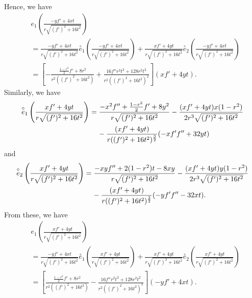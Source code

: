 \documentclass{amsart}
\theoremstyle{Corollary}
\numberwithin{equation}{section}
\begin{document}
Hence, we have 
\begin{equation}\label{3.12}
\begin{split}
&e_1\left(\frac{-yf'+4xt}{r\sqrt{(f')^2+16t^2}}
\right)\\
&=\frac{-yf'+4xt}{r\sqrt{(f')^2+16t^2}}
\overset{\circ}{e}_1\left(\frac{-yf'+4xt}{r\sqrt{(f')^2+16t^2}}\right)
+\frac{xf'+4yt}
{r\sqrt{(f')^2+16t^2}}\overset{\circ}{e}_2\left(\frac{-yf'+4xt}{r\sqrt{(f')^2+16t^2}}\right)\\
&=\left[-\frac{\frac{1-r^2}{2}f'+8r^2}{r^2((f')^2+16t^2)}+\frac{16f''r^2t^2+128r^2t^2}{r^2((f')^2+16t^2)^{2}}\right](xf'+4yt).
\end{split}
\end{equation}
Similarly, we have
\begin{equation*}
\begin{split}
\overset{\circ}{e}_1\left(\frac{xf'+4yt}
{r\sqrt{(f')^2+16t^2}}\right)
&=\frac{-x^2f''+\frac{1-r^2}{2}f'+8y^2}{r\sqrt{(f')^2+16t^2}}-\frac{(xf'+4yt)x(1-r^2)}{2r^3\sqrt{(f')^2+16t^2}}\\
&\hspace{4mm}-\frac{(xf'+4yt)}{r((f')^2+16t^2)^{\frac{3}{2}}}(-xf'f''+32yt)
\end{split}
\end{equation*}
and 
\begin{equation*}
\begin{split}
\overset{\circ}{e}_2\left(\frac{xf'+4yt}
{r\sqrt{(f')^2+16t^2}}\right)
&=\frac{-xyf''+2(1-r^2)t-8xy}{r\sqrt{(f')^2+16t^2}}-\frac{(xf'+4yt)y(1-r^2)}{2r^3\sqrt{(f')^2+16t^2}}\\
&\hspace{4mm}-\frac{(xf'+4yt)}{r((f')^2+16t^2)^{\frac{3}{2}}}(-yf'f''-32xt).
\end{split}
\end{equation*}
From these, we have 
\begin{equation}\label{3.13}
\begin{split}
&e_1\left(\frac{xf'+4yt}{r\sqrt{(f')^2+16t^2}}
\right)\\
&=\frac{-yf'+4xt}{r\sqrt{(f')^2+16t^2}}
\overset{\circ}{e}_1\left(\frac{xf'+4yt}{r\sqrt{(f')^2+16t^2}}
\right)
+\frac{xf'+4yt}
{r\sqrt{(f')^2+16t^2}}\overset{\circ}{e}_2\left(\frac{xf'+4yt}{r\sqrt{(f')^2+16t^2}}
\right)\\
&=\left[\frac{\frac{1-r^2}{2}f'+8r^2}{r^2((f')^2+16t^2)}-\frac{16f''r^2t^2+128r^2t^2}{r^2((f')^2+16t^2)^{2}}\right]
(-yf'+4xt).
\end{split}
\end{equation}
\end{document}
